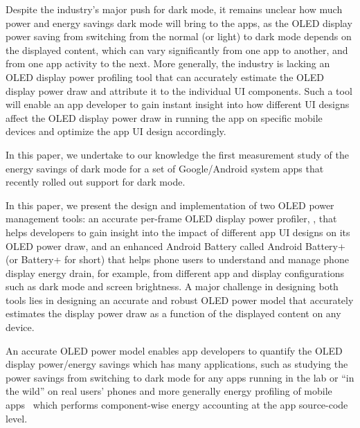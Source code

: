 Despite the industry's major push for dark mode, it remains unclear
how much power and energy savings dark mode will bring to the apps, as
the OLED display power saving from switching from the normal (or
light) to dark mode depends on the displayed content, which can vary
significantly from one app to another, and from one app activity to
the next. More generally, the industry is lacking an OLED display
power profiling tool that can accurately estimate the OLED display
power draw and attribute it to the individual UI components.  Such a
tool will enable an app developer to gain instant insight into how different
UI designs affect the OLED display power draw in running the app on
specific mobile devices and optimize the app UI design accordingly.

In this paper, we undertake to our knowledge the first measurement
study of the energy savings of dark mode for a set of Google/Android system
apps that recently rolled out support for dark mode.
\fi

In this paper, we present the design and implementation
of two OLED power management tools:
an accurate per-frame OLED display power profiler, \namee, that helps
developers to gain insight into the impact of different app UI designs
on its OLED power draw, and an enhanced Android Battery called Android Battery+ 
(or Battery+ for short) that
helps phone users to understand and manage phone
display energy drain, for example, from different app and display
configurations such as dark mode and screen brightness. A major challenge in
designing both tools lies
in designing an accurate and robust
OLED power model that accurately estimates the display power draw
as a function of the displayed content on any device.

An accurate OLED power model enables app developers to
quantify the OLED display power/energy savings which has many
applications, such as studying the power savings from switching to
dark mode for any apps running in the lab or ``in the wild'' on real
users' phones
and more generally energy profiling of mobile
apps~\cite{appscope,zhang2010accurate,shye2009into,pathak:eurosys12,mittal:mobicom12,androidprofiler}
which performs component-wise energy accounting at the app source-code
level.
\fi


